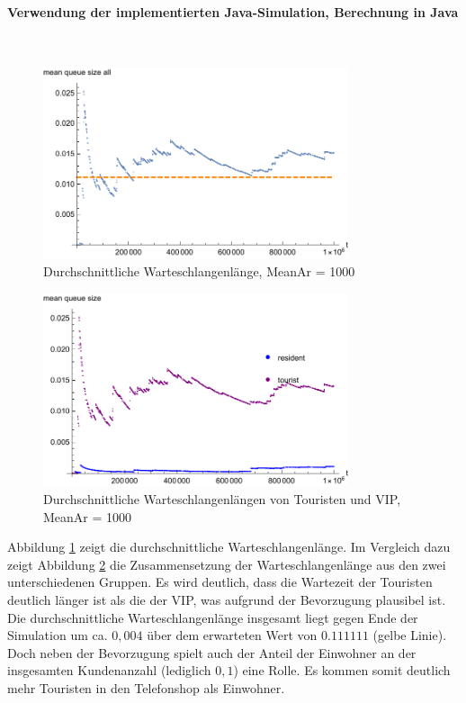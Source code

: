 \paragraph{Verwendung der implementierten Java-Simulation, Berechnung in Java}
\label{JavaVIPPhone1000}
\\
\begin{figure}[htpb]
	\centering
	\includegraphics[width=0.8\textwidth]{abbildungen/1_Phone_VIP/Arrival_1000_Serve_100_dur_1000000_Skip_0/MeanQueueSizeAll.pdf}
	\caption{Durchschnittliche Warteschlangenlänge, MeanAr = 1000}
	\label{fig:MQSVIP1000ALL}
\end{figure} 

\begin{figure}[htpb]
	\centering
	\includegraphics[width=0.8\textwidth]{abbildungen/1_Phone_VIP/Arrival_1000_Serve_100_dur_1000000_Skip_0/MeanQueueSizeTouristAndResident.pdf}
	\caption{Durchschnittliche Warteschlangenlängen von Touristen und VIP, MeanAr = 1000}
	\label{fig:MQSVIP1000VGL}
\end{figure}

Abbildung \ref{fig:MQSVIP1000ALL} zeigt die durchschnittliche Warteschlangenlänge. Im Vergleich dazu zeigt Abbildung \ref{fig:MQSVIP1000VGL} die Zusammensetzung der Warteschlangenlänge aus den zwei unterschiedenen Gruppen. Es wird deutlich, dass die Wartezeit der Touristen deutlich länger ist als die der VIP, was aufgrund der Bevorzugung plausibel ist. Die durchschnittliche Warteschlangenlänge insgesamt liegt gegen Ende der Simulation um ca. $0,004$ über dem erwarteten Wert von $0.111111$ (gelbe Linie). Doch neben der Bevorzugung spielt auch der Anteil der Einwohner an der insgesamten Kundenanzahl (lediglich $0,1$) eine Rolle. Es kommen somit deutlich mehr Touristen in den Telefonshop als Einwohner.

